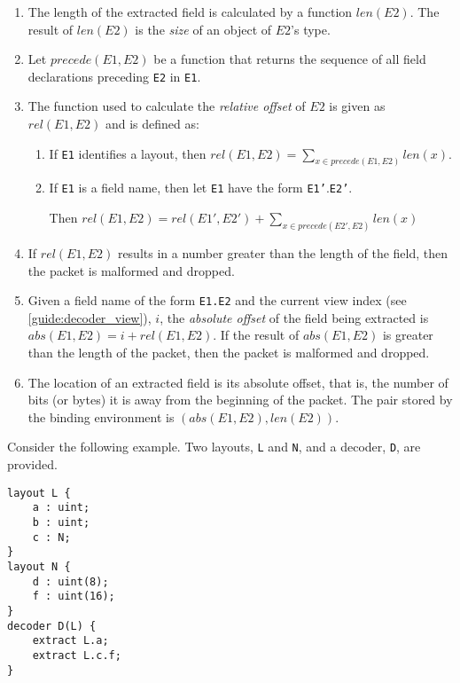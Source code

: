 \begin{enumerate}
\item The length of the extracted field is calculated by a function $len(E2)$. The result of $len(E2)$ is the \textit{size} of an object of $E2$'s type.

\item  Let $precede(E1, E2)$ be a function that returns the sequence of all field declarations preceding \texttt{E2} in \texttt{E1}.

\item The function used to calculate the \textit{relative offset} of $E2$ is given as $rel(E1, E2)$ and is defined as:

\begin{enumerate}

\item If \texttt{E1} identifies a layout, then $rel(E1, E2) = \sum_{x \in precede(E1,E2)}{} len(x)$.

\item If \texttt{E1} is a field name, then let \texttt{E1} have the form \texttt{E1'}.\texttt{E2'}.

Then $rel(E1, E2)=rel(E1', E2') + \sum_{x \in precede(E2',E2)}{} len(x)$

\end{enumerate}

\item If $rel(E1, E2)$ results in a number greater than the length of the field, then the packet is malformed and dropped.

\item Given a field name of the form \texttt{E1.E2} and the current view index (see \ref{guide:decoder_view}), $i$, the \textit{absolute offset} of the field being extracted is $abs(E1, E2) = i + rel(E1, E2)$.
If the result of $abs(E1, E2)$ is greater than the length of the packet, then the packet is malformed and dropped.

\item The location of an extracted field is its absolute offset, that is, the number of bits (or bytes) it is away from the beginning of the packet. The pair stored by the binding environment is $(abs(E1, E2), len(E2))$.

\end{enumerate}

Consider the following example. Two layouts, \texttt{L} and \texttt{N}, and a decoder, \texttt{D}, are provided.

\begin{minip}
\begin{lstlisting}
layout L {
	a : uint;
	b : uint;
	c : N;
}
layout N {
	d : uint(8);
	f : uint(16);
}
decoder D(L) {
	extract L.a;
	extract L.c.f;
}
\end{lstlisting}
\end{minip}

